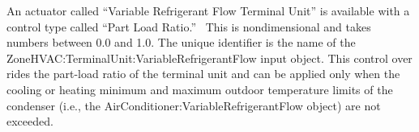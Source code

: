 An actuator called ``Variable Refrigerant Flow Terminal Unit'' is available with a control type called ``Part Load Ratio.''~ This is nondimensional and takes numbers between 0.0 and 1.0. The unique identifier is the name of the ZoneHVAC:TerminalUnit:VariableRefrigerantFlow input object. This control over rides the part-load ratio of the terminal unit and can be applied only when the cooling or heating minimum and maximum outdoor temperature limits of the condenser (i.e., the AirConditioner:VariableRefrigerantFlow object) are not exceeded.

